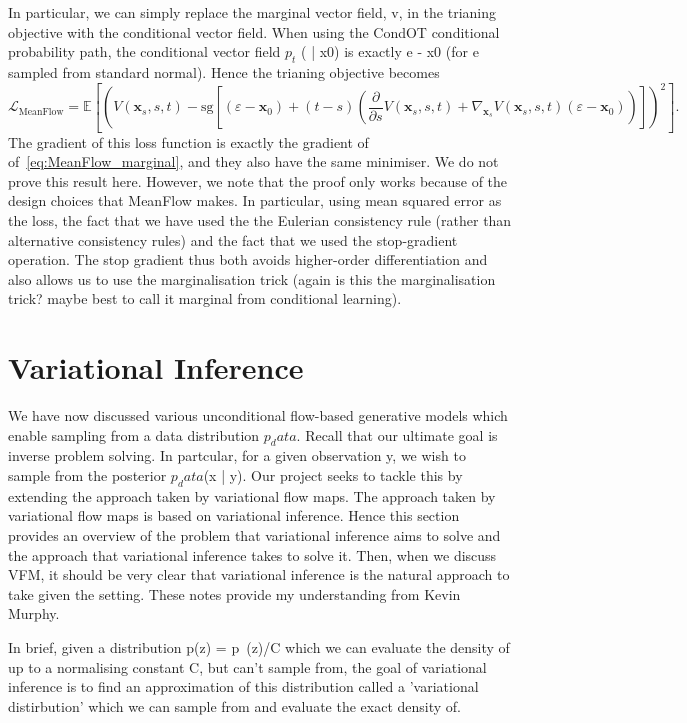 \documentclass[12pt,a4paper]{report}
\begin{document}
In particular, we can simply replace the marginal vector field, v, in the trianing objective with the conditional vector field. When using the CondOT conditional probability path, the conditional vector field $p_t$ ( | x0) is exactly e - x0 (for e sampled from standard normal). 
Hence the trianing objective becomes 
\begin{equation}
\label{eq:MeanFlow_conditional}
\mathcal{L}_{\text{MeanFlow}} =
\mathbb{E} \left[ \left( V(\mathbf{x}_s, s, t) - \text{sg} \left[ (\varepsilon - \mathbf{x}_0)+ (t - s) \left( \frac{\partial}{\partial s} V(\mathbf{x}_s, s, t) + \nabla_{\mathbf{x}_s} V(\mathbf{x}_s, s, t) (\varepsilon - \mathbf{x}_0)\right) \right] \right)^2 \right].
\end{equation}
The gradient of this loss function is exactly the gradient of of~\ref{eq:MeanFlow_marginal}, and they also have the same minimiser. We do not prove this result here. However, we note that the proof only works because of the design choices that MeanFlow makes. In particular, using mean squared error as the loss, the fact that we have used the the Eulerian consistency rule (rather than alternative consistency rules) and the fact that we used the stop-gradient operation. The stop gradient thus both avoids higher-order differentiation and also allows us to use the marginalisation trick (again is this the marginalisation trick? maybe best to call it marginal from conditional learning). 

\section{Variational Inference}
We have now discussed various unconditional flow-based generative models which enable sampling from a data distribution $p_data$. 
Recall that our ultimate goal is inverse problem solving. 
In partcular, for a given observation y, we wish to sample from the posterior $p_data$(x | y). 
Our project seeks to tackle this by extending the approach taken by variational flow maps.
The approach taken by variational flow maps is based on variational inference.
Hence this section provides an overview of the problem that variational inference aims to solve and the approach that variational inference takes to solve it.
Then, when we discuss VFM, it should be very clear that variational inference is the natural approach to take given the setting. 
These notes provide my understanding from Kevin Murphy. 

In brief, given a distribution p(z) = p~(z)/C which we can evaluate the density of up to a normalising constant C, but can't sample from, the goal of variational inference is to find an approximation of this distribution called a 'variational distirbution' which we can sample from and evaluate the exact density of. 
\end{document}
